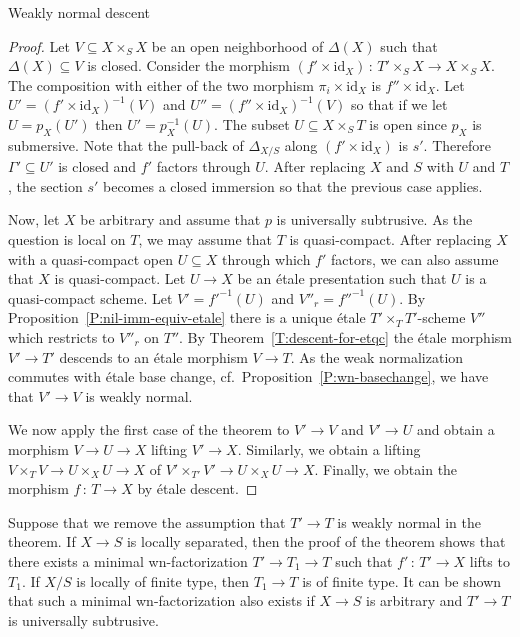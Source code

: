 \documentclass[a4paper,twoside,11pt]{amsart}[2009/07/02] %
\newcommand{\pref}[1]{\eqref{#1}}
\newcommand{\map}[3]{#1\,:\, #2\rightarrow #3}
\newcommand{\etale}{\'{e}tale}
\newcommand{\red}{\mathrm{red}}
\newcommand\id[1]{\mathrm{id}_{#1}}
\begin{document}
\begin{section}{Weakly normal descent}
\begin{proof}
Let $V\subseteq X\times_S X$ be an open neighborhood of $\Delta(X)$ such that
$\Delta(X)\subseteq V$ is closed. Consider the morphism $\map{(f'\times
\id{X})}{T'\times_S X}{X\times_S X}$. The composition with
either of the two morphism $\pi_i\times \id{X}$ is $f''\times \id{X}$.  Let
$U'=(f'\times\id{X})^{-1}(V)$ and $U''=(f''\times\id{X})^{-1}(V)$ so that if we
let $U=p_X(U')$ then $U'=p_X^{-1}(U)$. The subset
$U\subseteq X\times_S T$ is open since $p_X$ is submersive.
%
Note that the pull-back of $\Delta_{X/S}$ along $(f'\times \id{X})$ is $s'$.
Therefore $\Gamma'\subseteq U'$ is closed and $f'$ factors
through $U$. After replacing $X$ and $S$ with $U$ and $T$, the section $s'$
becomes a closed immersion so that the previous case applies.

Now, let $X$ be arbitrary and assume that $p$ is universally subtrusive. As the
question is local on $T$, we may assume that $T$ is quasi-compact. After
replacing $X$ with a quasi-compact open $U\subseteq X$ through which $f'$
factors, we can also assume that $X$ is quasi-compact. Let $U\to X$ be an
\etale{} presentation such that $U$ is a quasi-compact scheme. Let
$V'=f'^{-1}(U)$ and $V''_r=f''^{-1}(U)$. By
Proposition~\pref{P:nil-imm-equiv-etale} there is a unique \etale{} $T'\times_T
T'$-scheme $V''$ which restricts to $V''_r$ on $T''$. By
Theorem~\pref{T:descent-for-etqc} the \etale{} morphism $V'\to T'$ descends to
an \etale{} morphism $V\to T$. As the weak normalization commutes with \etale{}
base change, cf.\ Proposition~\pref{P:wn-basechange}, we have that $V'\to V$ is
weakly normal.

We now apply the first case of the theorem to $V'\to V$ and $V'\to U$ and
obtain a morphism $V\to U\to X$ lifting $V'\to X$. Similarly, we obtain a
lifting $V\times_T V\to U\times_X U\to X$ of $V'\times_{T'} V'\to U\times_{X}
U\to X$. Finally, we obtain the morphism $\map{f}{T}{X}$ by \etale{} descent.
\end{proof}

\begin{remark}
Suppose that we remove the assumption that $T'\to T$ is weakly normal in the
theorem. If $X\to S$ is locally separated, then the proof of the theorem shows
that there exists a minimal wn-factorization $T'\to T_1\to T$ such that
$\map{f'}{T'}{X}$ lifts to $T_1$.
%
%
If $X/S$ is locally of finite type, then $T_1\to T$ is of finite type.
%
%
It can be shown that such a minimal wn-factorization also exists
if $X\to S$ is arbitrary and $T'\to T$ is universally subtrusive.
\end{remark}


\end{section}
\end{document}
